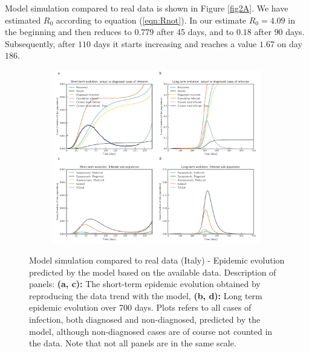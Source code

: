 \documentclass[10pt]{wlscirep}
\begin{document}
Model simulation compared to real data is shown in Figure \ref{fig2A}. We have estimated $R_0$ according to equation (\ref*{eqn:Rnot}). In our estimate $R_0 = 4.09$ in the beginning and then reduces to $0.779$ after 45 days, and to $0.18$ after $90$ days. Subsequently, after $110$ days it starts increasing and reaches a value $1.67$ on day $186$.
%
\begin{figure}[t!]
	\centering
	\begin{subfigure}[b]{\textwidth}
		\centering
		\includegraphics[width=\linewidth]{Italy_evolution.pdf}
	\end{subfigure}
	\caption{Model simulation compared to real data (Italy) - Epidemic evolution predicted by the model based on the available data. Description of panels: \textbf{(a, c):} The short-term epidemic evolution obtained by reproducing the data trend with the model, \textbf{(b, d):} Long term epidemic evolution over 700 days. Plots refers to all cases of infection, both diagnosed and non-diagnosed, predicted by the model, although non-diagnosed cases are of course not counted in the data. Note that not all panels are in the same scale.}
	\label{fig2B} 
\end{figure}
%
\end{document}

